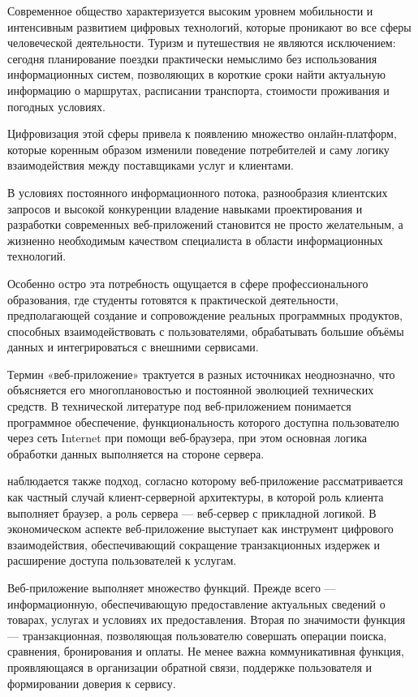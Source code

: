 \documentclass[14pt,a4paper,oneside]{extreport}
\begin{document}
Современное общество характеризуется высоким уровнем мобильности и интенсивным развитием цифровых технологий, которые проникают во все сферы человеческой деятельности. Туризм и путешествия не являются исключением: сегодня планирование поездки практически немыслимо без использования информационных систем, позволяющих в короткие сроки найти актуальную информацию о маршрутах, расписании транспорта, стоимости проживания и погодных условиях.

Цифровизация этой сферы привела к появлению множество онлайн-платформ, которые коренным образом изменили поведение потребителей и саму логику взаимодействия между поставщиками услуг и клиентами.

В условиях постоянного информационного потока, разнообразия клиентских запросов и высокой конкуренции владение навыками проектирования и разработки современных веб-приложений становится не просто желательным, а жизненно необходимым качеством специалиста в области информационных технологий.

Особенно остро эта потребность ощущается в сфере профессионального образования, где студенты готовятся к практической деятельности, предполагающей создание и сопровождение реальных программных продуктов, способных взаимодействовать с пользователями, обрабатывать большие объёмы данных и интегрироваться с внешними сервисами.

Термин «веб-приложение» трактуется в разных источниках неоднозначно, что объясняется его многоплановостью и постоянной эволюцией технических средств. В технической литературе под веб-приложением понимается программное обеспечение, функциональность которого доступна пользователю через сеть Internet при помощи веб-браузера, при этом основная логика обработки данных выполняется на стороне сервера.

наблюдается также подход, согласно которому веб-приложение рассматривается как частный случай клиент-серверной архитектуры, в которой роль клиента выполняет браузер, а роль сервера — веб-сервер с прикладной логикой. В экономическом аспекте веб-приложение выступает как инструмент цифрового взаимодействия, обеспечивающий сокращение транзакционных издержек и расширение доступа пользователей к услугам.

Веб-приложение выполняет множество функций. Прежде всего — информационную, обеспечивающую предоставление актуальных сведений о товарах, услугах и условиях их предоставления. Вторая по значимости функция — транзакционная, позволяющая пользователю совершать операции поиска, сравнения, бронирования и оплаты. Не менее важна коммуникативная функция, проявляющаяся в организации обратной связи, поддержке пользователя и формировании доверия к сервису.
\end{document}

